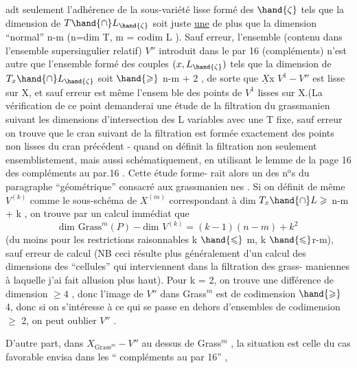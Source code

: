 
adt seulement l'adhérence de la sous-variété lisse formé des $\hand{\zeta}$ tels que
la dimension de $T\hand{\cap}L_{\hand{\zeta}}$ soit juste \uline{une} de plus que la dimension
``normal'' n-m (n=dim T, m = codim L ). Sauf erreur, l'ensemble
(contenu dans l'ensemble supersingulier relatif) $V''$ introduit dans le par
16 (compléments) n'est autre que l'ensemble formé des couples
$(x,L_{\hand{\zeta}})$ tels que la dimension de $T_x\hand{\cap}L_{\hand{\zeta}}$ soit $\hand{\geqslant}$ n-m + 2\hand{)} , de sorte que
$\underline{X}$x $V^1 - V''$ est  lisse sur X, et sauf erreur est même  l'ensem
ble des points de $V^1$ lisses sur X.(La vérification de ce point demanderai
une étude de la filtration du   grassmanien suivant les 
dimensions d'intersection des L variables avec une T fixe, sauf erreur on
trouve que le cran suivant de la filtration est formée exactement des
points non lisses du cran précédent - quand on définit la filtration
\margin{$|$} non seulement ensemblistement, mais aussi schématiquement, en utilisant
\margin{$|$} le lemme de la page 16 des compléments au par.16 \hand{\unsure{)}}. Cette étude forme-%
\margin{$|$} rait alors un des n$^{\text{o}}$s du paragraphe ``géométrique'' consacré aux grassmanien
\margin{$|$} nes \hand{)}. Si on définit de même  $V^{(k)}$ comme le sous-schéma de $X^{(m)}$
correspondant à dim $T_x\hand{\cap}L \geqslant$ n-m + k , on trouve par un calcul immédiat
que 
\[ \text{dim Grass}^m(P) - \text{dim } V^{(k)} = (k-1)(n-m) + k^2 \]
(du moins pour les restrictions raisonnables k $\hand{\leqslant}$ m, k $\hand{\leqslant}$r-m), sauf
erreur de calcul (NB ceci résulte plus généralement d'un calcul des
dimensions des ``cellules'' qui interviennent dans la filtration des grass-%
maniennes à laquelle j'ai fait allusion plus haut). Pour k = 2, on
trouve une différence de dimension $\geqslant 4$ , donc l'image de $V''$ dans Grass$^m$
est de codimension $\hand{\geqslant}$ 4, donc si on s'intéresse à ce qui se passe en dehors
d'ensembles  de codimension $\geqslant$ 2, on peut  oublier $V''$ .

D'autre part, dans $X_{\text{Grass}^m} - V''$ au dessus de Grass$^m$ , la situation
est celle du cas favorable envisa dans les `` compléments au par 16'' ,

